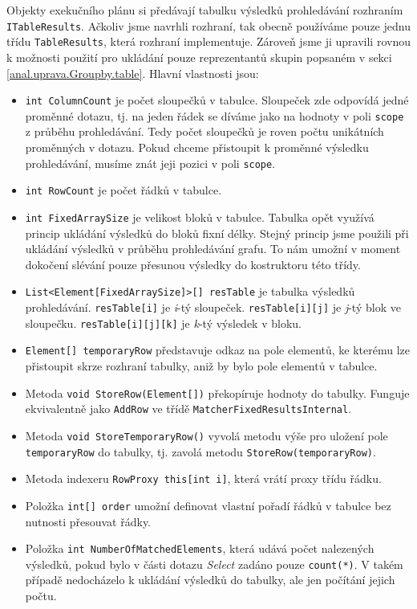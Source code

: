 Objekty exekučního plánu si předávají tabulku výsledků prohledávání rozhraním \texttt{ITableResults}.
Ačkoliv jsme navrhli rozhraní, tak obecně používáme pouze jednu třídu \texttt{TableResults}, která rozhraní implementuje.
Zároveň jsme ji upravili rovnou k možnosti použití pro ukládání pouze reprezentantů skupin popsaném v sekci \ref{anal.uprava.Groupby.table}.
Hlavní vlastnosti jsou:
\begin{itemize}
\item \texttt{int ColumnCount} je počet sloupečků v tabulce.
Sloupeček zde odpovídá jedné proměnné dotazu, tj. na jeden řádek se díváme jako na hodnoty v poli \texttt{scope} z průběhu prohledávání.
Tedy počet sloupečků je roven počtu unikátních proměnných v dotazu.
Pokud chceme přistoupit k proměnné výsledku prohledávání, musíme znát jeji pozici v poli \texttt{scope}.

\item \texttt{int RowCount} je počet řádků v tabulce.
\item \texttt{int FixedArraySize} je velikost bloků v tabulce.
Tabulka opět využívá princip ukládání výsledků do bloků fixní délky.
Stejný princip jsme použili při ukládání výsledků v průběhu prohledávání grafu.
To nám umožní v moment dokočení slévání pouze přesunou výsledky do kostruktoru této třídy.
\item \texttt{List<Element[FixedArraySize]>[] resTable} je tabulka výsledků prohledávání.
\texttt{resTable[i]} je \textit{i}-tý sloupeček.
\texttt{resTable[i][j]} je \textit{j}-tý blok ve sloupečku.
\texttt{resTable[i][j][k]} je \textit{k}-tý výsledek v bloku.
\item \texttt{Element[] temporaryRow} představuje odkaz na pole elementů, ke kterému lze přistoupit skrze rozhraní tabulky, aniž by bylo pole elementů v tabulce.
\item Metoda \texttt{void StoreRow(Element[])} překopíruje hodnoty do tabulky. Funguje ekvivalentně jako \texttt{AddRow} ve třídě \texttt{MatcherFixedResultsInternal}.
\item Metoda \texttt{void StoreTemporaryRow()} vyvolá metodu výše pro uložení pole \texttt{temporaryRow} do tabulky, tj. zavolá metodu \texttt{StoreRow(temporaryRow)}.
\item Metoda indexeru \texttt{RowProxy this[int i]}, která vrátí proxy třídu řádku.
\item Položka \texttt{int[] order} umožní definovat vlastní pořadí řádků v tabulce bez nutnosti přesouvat řádky.
\item Položka \texttt{int NumberOfMatchedElements}, která udává počet nalezených výsledků, pokud bylo v části dotazu \textit{Select} zadáno pouze \texttt{count(*)}.
V takém případě nedocházelo k ukládání výsledků do tabulky, ale jen počítání jejich počtu.

\end{itemize}
